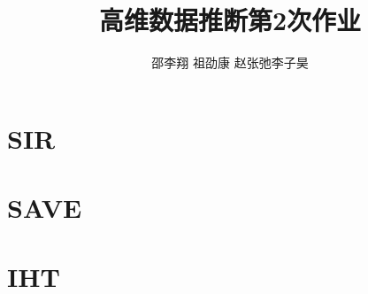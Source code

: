 \documentclass[cn,11pt]{elegantpaper}
\title{高维数据推断第2次作业}
\author{邵李翔 \quad 祖劭康 \quad 赵张弛\quad 李子昊}
\date{}
\begin{document}
    


\maketitle
\newpage
\tableofcontents

\newpage


\section{SIR}

\section{SAVE}


\section{IHT}

\end{document}
